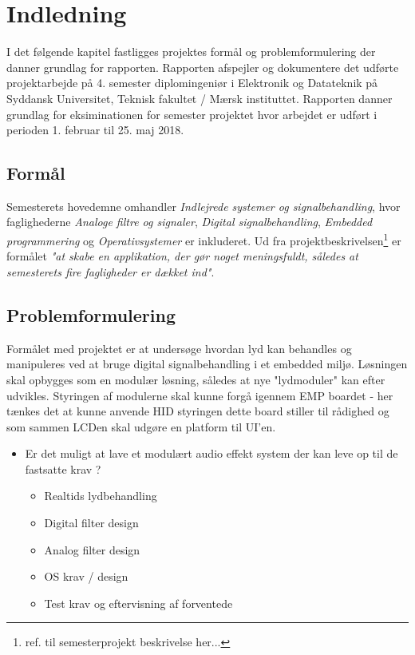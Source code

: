 \chapter{Indledning}
\vspace*{0.5 cm}
I det følgende kapitel fastligges projektes formål og problemformulering der danner grundlag for rapporten.
Rapporten afspejler og dokumentere det udførte projektarbejde på 4. semester diplomingeniør i Elektronik og Datateknik på Syddansk Universitet, Teknisk fakultet / Mærsk instituttet.
Rapporten danner grundlag for eksiminationen for semester projektet hvor arbejdet er udført i perioden 1. februar til 25. maj 2018.

\section{Formål}
Semesterets hovedemne omhandler \emph{Indlejrede systemer og signalbehandling}, hvor faglighederne \emph{Analoge filtre og signaler}, \emph{Digital signalbehandling}, \emph{Embedded programmering} og \emph{Operativsystemer} er inkluderet.
Ud fra projektbeskrivelsen\footnote{ref. til  semesterprojekt beskrivelse her...} er formålet\textit{ "at skabe en applikation, der gør noget meningsfuldt, således at semesterets fire fagligheder er dækket ind"}.


\section{Problemformulering}
Formålet med projektet er at undersøge hvordan lyd kan behandles og manipuleres ved at bruge digital signalbehandling i et embedded miljø.
Løsningen skal opbygges som en modulær løsning, således at nye "lydmoduler" kan efter udvikles.
Styringen af modulerne skal kunne forgå igennem EMP boardet - her tænkes det at kunne anvende HID styringen dette board stiller til rådighed og som sammen LCDen skal udgøre en platform til UI'en. 


\begin{itemize}
	\item Er det muligt at lave et modulært audio effekt system der kan leve op til de fastsatte krav ? 

	\begin{itemize}
		
		\item Realtids lydbehandling 
		\item Digital filter design
		\item Analog filter design
		\item OS krav / design
		\item Test krav og eftervisning af forventede
	\end{itemize}
\end{itemize}


